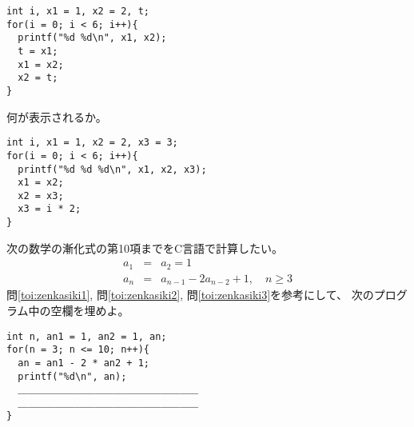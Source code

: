\documentclass[12pt,a4j]{jarticle}
\newcounter{toi}
\def\toi{%
\bigskip\bigskip\noindent
\addtocounter{toi}{1}
\shadowbox{\bfseries\large 問\thetoi}
\nopagebreak[4]\bigskip\nopagebreak[4]
}
\begin{document}
\begin{verbatim}
int i, x1 = 1, x2 = 2, t;
for(i = 0; i < 6; i++){
  printf("%d %d\n", x1, x2);
  t = x1;
  x1 = x2;
  x2 = t;
} 
\end{verbatim}




\toi
\label{toi:zenkasiki3}

何が表示されるか。
\begin{verbatim}
int i, x1 = 1, x2 = 2, x3 = 3;
for(i = 0; i < 6; i++){
  printf("%d %d %d\n", x1, x2, x3);
  x1 = x2;
  x2 = x3;
  x3 = i * 2;
} 
\end{verbatim}




\toi
\label{toi:zenkasiki4}

次の数学の漸化式の第10項までをC言語で計算したい。
\begin{eqnarray*}
 a_1 &=& a_2 = 1\\
 a_n &=& a_{n-1} - 2 a_{n-2} + 1, \quad n \ge 3
\end{eqnarray*}
問\ref{toi:zenkasiki1},
問\ref{toi:zenkasiki2},
問\ref{toi:zenkasiki3}を参考にして、
次のプログラム中の空欄を埋めよ。
\begin{verbatim}
int n, an1 = 1, an2 = 1, an;
for(n = 3; n <= 10; n++){
  an = an1 - 2 * an2 + 1;
  printf("%d\n", an);
  ＿＿＿＿＿＿＿＿＿＿＿＿＿＿＿＿＿＿＿
  ＿＿＿＿＿＿＿＿＿＿＿＿＿＿＿＿＿＿＿
}
\end{verbatim}






\toi
\end{document}
